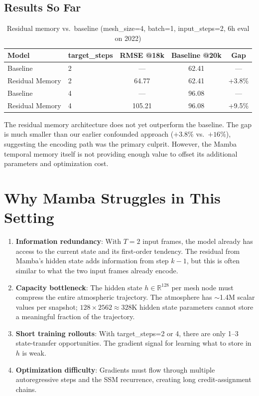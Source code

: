 \documentclass[11pt,a4paper]{article}
\begin{document}
\subsection{Results So Far}

\begin{table}[H]
\centering
\caption{Residual memory vs.\ baseline (mesh\_size=4, batch=1, input\_steps=2, 6h eval on 2022)}
\begin{tabular}{llccc}
\toprule
Model & target\_steps & RMSE @18k & Baseline @20k & Gap \\
\midrule
Baseline & 2 & --- & 62.41 & --- \\
Residual Memory & 2 & 64.77 & 62.41 & +3.8\% \\
\midrule
Baseline & 4 & --- & 96.08 & --- \\
Residual Memory & 4 & 105.21 & 96.08 & +9.5\% \\
\bottomrule
\end{tabular}
\end{table}

The residual memory architecture does not yet outperform the baseline. The gap is much smaller than our earlier confounded approach ($+3.8\%$ vs.\ $+16\%$), suggesting the encoding path was the primary culprit. However, the Mamba temporal memory itself is not providing enough value to offset its additional parameters and optimization cost.

\section{Why Mamba Struggles in This Setting}

\begin{enumerate}
  \item \textbf{Information redundancy}: With $T{=}2$ input frames, the model already has access to the current state and its first-order tendency. The residual from Mamba's hidden state adds information from step $k{-}1$, but this is often similar to what the two input frames already encode.

  \item \textbf{Capacity bottleneck}: The hidden state $h \in \mathbb{R}^{128}$ per mesh node must compress the entire atmospheric trajectory. The atmosphere has $\sim$1.4M scalar values per snapshot; $128 \times 2562 \approx 328$K hidden state parameters cannot store a meaningful fraction of the trajectory.

  \item \textbf{Short training rollouts}: With target\_steps=2 or 4, there are only 1--3 state-transfer opportunities. The gradient signal for learning what to store in $h$ is weak.

  \item \textbf{Optimization difficulty}: Gradients must flow through multiple autoregressive steps and the SSM recurrence, creating long credit-assignment chains.
\end{enumerate}
\end{document}

